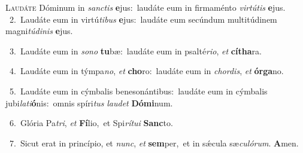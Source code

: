 \lettrine{\initial\textcolor{\initialcolor}{L}}{audáte} Dóminum in \textit{sanc}\-\textit{tis} \textbf{e}\-jus:~\star laudáte eum in firmaménto \textit{vir}\-\textit{tú}\textit{tis} \textbf{e}\-jus.\\
{\numbfont\textcolor{\numbcolor}{~2.}}~Laudáte eum in virtú\-\textit{ti}\-\textit{bus} \textbf{e}\-jus:~\star laudáte eum secúndum multitúdinem magni\-\textit{tú}\-\textit{di}\textit{nis} \textbf{e}\-jus.\par
{\numbfont\textcolor{\numbcolor}{~3.}}~Laudáte eum in \textit{so}\-\textit{no} \textbf{tu}\-bæ:~\star laudáte eum in psalté\-\textit{ri}\-\textit{o}, \textit{et} \textbf{cí}\-\textbf{tha}ra.\par
{\numbfont\textcolor{\numbcolor}{~4.}}~Laudáte eum in týmpa\-\textit{no}\-, \textit{et} \textbf{cho}\-ro:~\star laudáte eum in \textit{chor}\-\textit{dis}, \textit{et} \textbf{ór}\-\textbf{ga}no.\par
{\numbfont\textcolor{\numbcolor}{~5.}}~Laudáte eum in cýmbalis benesonántibus:~\dagger laudáte eum in cýmbalis jubi\-\textit{la}\-\textit{ti}\textbf{ó}nis:~\star omnis spíri\textit{tus} \textit{lau}\-\textit{det} \textbf{Dó}\-\textbf{mi}num.\par
{\numbfont\textcolor{\numbcolor}{~6.}}~Glória Pa\-\textit{tri}\-, \textit{et} \textbf{Fí}\-lio,~\star et Spi\-\textit{rí}\-\textit{tu}\textit{i} \textbf{Sanc}\-to.\par
{\numbfont\textcolor{\numbcolor}{~7.}}~Sicut erat in princípio, et \textit{nunc}\-, \textit{et} \textbf{sem}\-per,~\star et in sǽcula sæ\-\textit{cu}\-\textit{ló}\textit{rum}. \textbf{A}\-men.\par
